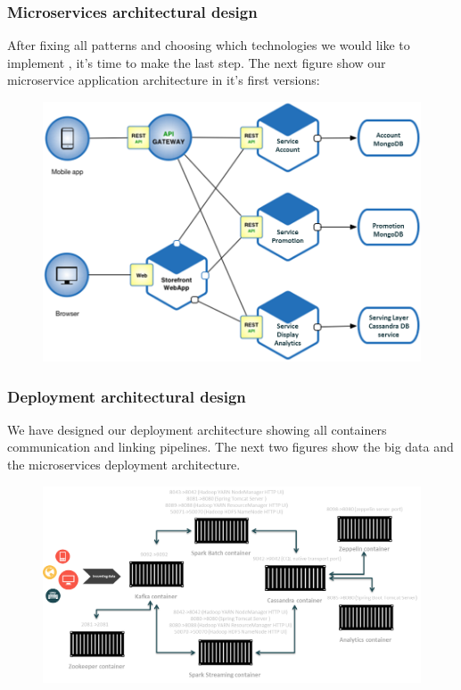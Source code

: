 \subsubsection{ Microservices architectural design }
After fixing all patterns and choosing which technologies we would like to implement , it's time to make the last step.
The next figure show our microservice application architecture in it's first versions:
\begin{figure}[h!]
	\centering
	\includegraphics[height=0.4\textheight]{fig01/MicroservicesArchitecture}
	\label{fig:FilialesEtClients}
\end{figure}

\subsubsection{ Deployment architectural design }
 We have designed our deployment architecture showing all containers communication and linking pipelines.
 The next two figures show the big data and the microservices deployment architecture.

 \begin{figure}[h!]
	\centering
	\includegraphics[height=0.3\textheight]{fig01/BigDatadeployment}
	\label{fig:FilialesEtClients}
\end{figure}

